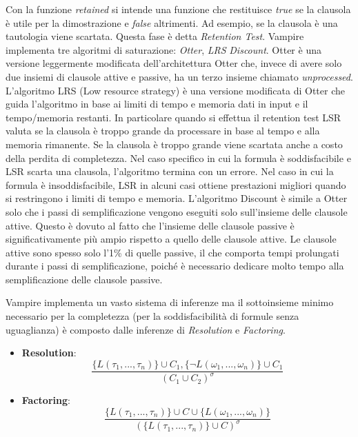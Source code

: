 \documentclass[./main.tex]{subfiles}
\begin{document}
Con la funzione \textit{retained} si intende una funzione che restituisce \textit{true} se la clausola 
è utile per la dimostrazione e \textit{false} altrimenti. 
Ad esempio, se la clausola è una tautologia viene scartata.
Questa fase è detta \textit{Retention Test}.
Vampire implementa tre algoritmi di saturazione: \textit{Otter}, \textit{LRS} \textit{Discount}.
Otter è una versione leggermente modificata dell'architettura Otter che, invece di avere solo due insiemi di clausole attive e passive,
ha un terzo insieme chiamato \textit{unprocessed}. 
L'algoritmo LRS (Low resource strategy) è una versione modificata di Otter che guida l'algoritmo in base ai limiti di tempo e memoria dati in input 
e il tempo/memoria restanti. 
In particolare quando si effettua il retention test LSR valuta se la clausola è troppo grande da processare in base al tempo e alla memoria rimanente.
Se la clausola è troppo grande viene scartata anche a costo della perdita di completezza.
Nel caso specifico in cui la formula è soddisfacibile e LSR scarta una clausola, l'algoritmo termina con un errore.
Nel caso in cui la formula è insoddisfacibile, LSR in alcuni casi ottiene prestazioni migliori quando si restringono i limiti di tempo e memoria.
L'algoritmo Discount è simile a Otter solo che i passi di semplificazione vengono eseguiti solo sull'insieme delle clausole attive.
Questo è dovuto al fatto che l'insieme delle clausole passive è significativamente più ampio rispetto a quello delle clausole attive. 
Le clausole attive sono spesso solo l'1\% di quelle passive, il che comporta tempi prolungati durante i passi di semplificazione, 
poiché è necessario dedicare molto tempo alla semplificazione delle clausole passive.

Vampire implementa un vasto sistema di inferenze ma il sottoinsieme minimo necessario per la completezza (per la soddisfacibilità di formule senza uguaglianza) è composto 
dalle inferenze di \textit{Resolution} e \textit{Factoring}.

\begin{itemize}
    \item[]\textbf{Resolution}: 
    $$ \frac{\{L(\tau_1, ..., \tau_n)\} \cup C_1, \{\lnot L(\omega_1, ..., \omega_n)\} \cup C_1}{(C_1 \cup C_2)^\sigma} $$
    \item[]\textbf{Factoring}: 
    $$ \frac{\{L(\tau_1, ..., \tau_n)\} \cup C \cup \{L(\omega_1, ..., \omega_n)\}}{(\{L(\tau_1, ..., \tau_n)\} \cup C)^\sigma} $$
\end{itemize}
\end{document}
